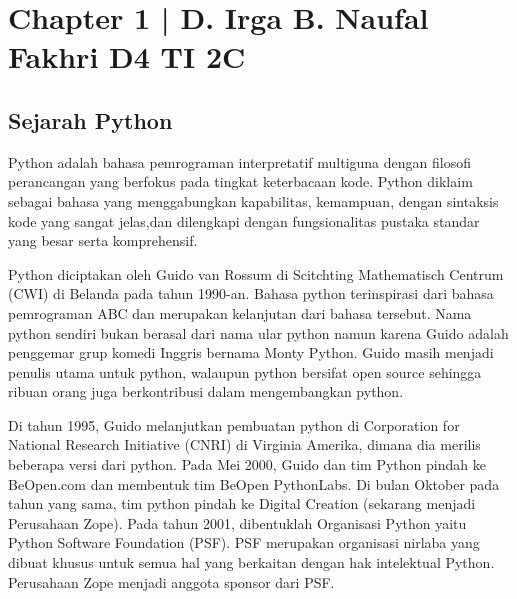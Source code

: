 
\section{Chapter 1 | D. Irga B. Naufal Fakhri D4 TI 2C}
\subsection{Sejarah Python}
	Python adalah bahasa pemrograman interpretatif multiguna dengan filosofi perancangan yang berfokus pada tingkat keterbacaan kode. Python diklaim sebagai bahasa yang menggabungkan kapabilitas, kemampuan, dengan sintaksis kode yang sangat jelas,dan dilengkapi dengan fungsionalitas pustaka standar yang besar serta komprehensif. 

	Python diciptakan oleh Guido van Rossum di Scitchting Mathematisch Centrum (CWI) di Belanda pada tahun 1990-an. Bahasa python terinspirasi dari bahasa pemrograman ABC dan merupakan kelanjutan dari bahasa tersebut. Nama python sendiri bukan berasal dari nama ular python namun karena Guido adalah penggemar grup komedi Inggris bernama Monty Python. Guido masih menjadi penulis utama untuk python, walaupun python bersifat open source sehingga ribuan orang juga berkontribusi dalam mengembangkan python.

	Di tahun 1995, Guido melanjutkan pembuatan python di Corporation for National Research Initiative (CNRI) di Virginia Amerika, dimana dia merilis beberapa versi dari python.
Pada Mei 2000, Guido dan tim Python pindah ke BeOpen.com dan membentuk tim BeOpen PythonLabs. Di bulan Oktober pada tahun yang sama, tim python pindah ke Digital Creation (sekarang menjadi Perusahaan Zope). Pada tahun 2001, dibentuklah Organisasi Python yaitu Python Software Foundation (PSF). PSF merupakan organisasi nirlaba yang dibuat khusus untuk semua hal yang berkaitan dengan hak intelektual Python. Perusahaan Zope menjadi anggota sponsor dari PSF.

